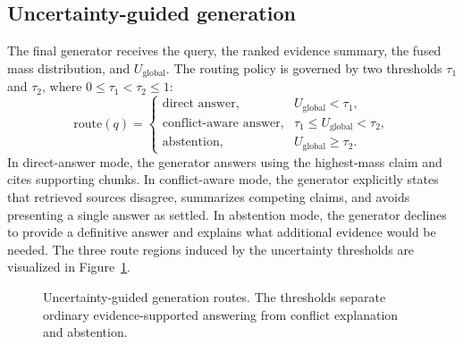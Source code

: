 \documentclass[preprint,12pt,authoryear,nopreprintline]{elsarticle}
\begin{document}
\subsection{Uncertainty-guided generation}

The final generator receives the query, the ranked evidence summary, the fused mass distribution, and $U_{\mathrm{global}}$. The routing policy is governed by two thresholds $\tau_1$ and $\tau_2$, where $0\leq\tau_1<\tau_2\leq1$:
\begin{equation}
\text{route}(q)=
\begin{cases}
\text{direct answer}, & U_{\mathrm{global}}<\tau_1,\\
\text{conflict-aware answer}, & \tau_1\leq U_{\mathrm{global}}<\tau_2,\\
\text{abstention}, & U_{\mathrm{global}}\geq\tau_2.
\end{cases}
    \label{eq:routing_policy}
\end{equation}
In direct-answer mode, the generator answers using the highest-mass claim and cites supporting chunks. In conflict-aware mode, the generator explicitly states that retrieved sources disagree, summarizes competing claims, and avoids presenting a single answer as settled. In abstention mode, the generator declines to provide a definitive answer and explains what additional evidence would be needed. The three route regions induced by the uncertainty thresholds are visualized in Figure~\ref{fig:routing_visual}.

\begin{figure}[H]
\centering
{}
\caption{Uncertainty-guided generation routes. The thresholds separate ordinary evidence-supported answering from conflict explanation and abstention.}
\label{fig:routing_visual}
\end{figure}
\end{document}
